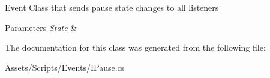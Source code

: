 Event Class that sends pause state changes to all listeners 


\begin{DoxyParams}{Parameters}
{\em State} & \\
\hline
\end{DoxyParams}


The documentation for this class was generated from the following file\+:\begin{DoxyCompactItemize}
\item 
Assets/\+Scripts/\+Events/I\+Pause.\+cs\end{DoxyCompactItemize}
